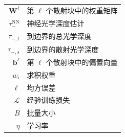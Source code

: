 \begin{nomenclature}
\begin{longtable}{rl}
        $\bm{W}^{\ell}$          & 第 $\ell$ 个散射块中的权重矩阵           \\
        $\tau^{\text{NN}}_{-}$   & 神经光学深度估计                      \\
        $\tau_{-,t}$             & 到边界的总光学深度                     \\
        $\tau_{-,s}$             & 到边界的散射光学深度                    \\
        $\bm{b}^{\ell}$          & 第 $\ell$ 个散射块中的偏置向量           \\
        $w_i$                    & 求积权重                          \\
        $\ell$                   & 均方误差                          \\
        $\mathcal{L}$            & 经验训练损失                        \\
        $B$                      & 批量大小                          \\
        $\eta$                   & 学习率                           \\
    \end{longtable}

\end{nomenclature}